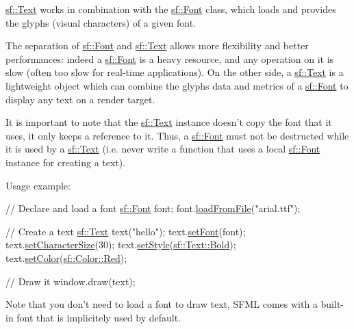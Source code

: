 \hyperlink{classsf_1_1_text}{sf\-::\-Text} works in combination with the \hyperlink{classsf_1_1_font}{sf\-::\-Font} class, which loads and provides the glyphs (visual characters) of a given font.

The separation of \hyperlink{classsf_1_1_font}{sf\-::\-Font} and \hyperlink{classsf_1_1_text}{sf\-::\-Text} allows more flexibility and better performances\-: indeed a \hyperlink{classsf_1_1_font}{sf\-::\-Font} is a heavy resource, and any operation on it is slow (often too slow for real-\/time applications). On the other side, a \hyperlink{classsf_1_1_text}{sf\-::\-Text} is a lightweight object which can combine the glyphs data and metrics of a \hyperlink{classsf_1_1_font}{sf\-::\-Font} to display any text on a render target.

It is important to note that the \hyperlink{classsf_1_1_text}{sf\-::\-Text} instance doesn't copy the font that it uses, it only keeps a reference to it. Thus, a \hyperlink{classsf_1_1_font}{sf\-::\-Font} must not be destructed while it is used by a \hyperlink{classsf_1_1_text}{sf\-::\-Text} (i.\-e. never write a function that uses a local \hyperlink{classsf_1_1_font}{sf\-::\-Font} instance for creating a text).

Usage example\-: 
\begin{DoxyCode}
\textcolor{comment}{// Declare and load a font}
\hyperlink{classsf_1_1_font}{sf::Font} font;
font.\hyperlink{classsf_1_1_font_ab020052ef4e01f6c749a85571c0f3fd1}{loadFromFile}(\textcolor{stringliteral}{"arial.ttf"});

\textcolor{comment}{// Create a text}
\hyperlink{classsf_1_1_text}{sf::Text} text(\textcolor{stringliteral}{"hello"});
text.\hyperlink{classsf_1_1_text_a2927805d1ae92d57f15034ea34756b81}{setFont}(font);
text.\hyperlink{classsf_1_1_text_ae96f835fc1bff858f8a23c5b01eaaf7e}{setCharacterSize}(30);
text.\hyperlink{classsf_1_1_text_ad791702bc2d1b6590a1719aa60635edf}{setStyle}(\hyperlink{classsf_1_1_text_aa8add4aef484c6e6b20faff07452bd82af1b47f98fb1e10509ba930a596987171}{sf::Text::Bold});
text.\hyperlink{classsf_1_1_text_afd1742fca1adb6b0ea98357250ffb634}{setColor}(\hyperlink{classsf_1_1_color_a127dbf55db9c07d0fa8f4bfcbb97594a}{sf::Color::Red});

\textcolor{comment}{// Draw it}
window.draw(text);
\end{DoxyCode}


Note that you don't need to load a font to draw text, S\-F\-M\-L comes with a built-\/in font that is implicitely used by default.

